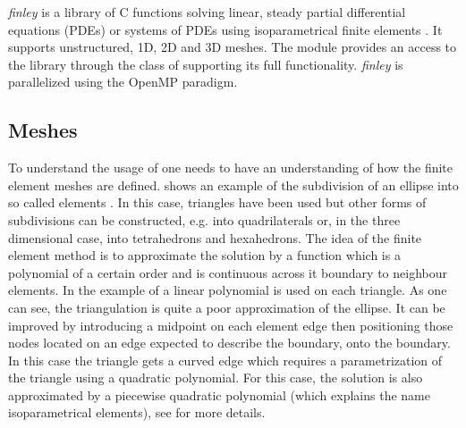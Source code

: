  

{\it finley} is a library of C functions solving linear, steady partial differential equations
 (PDEs) or systems of PDEs using isoparametrical finite 
elements .
It supports unstructured, 1D, 2D and 3D meshes. The module \finley provides an access to the
library through the \LinearPDE class of \escript supporting its full functionality. {\it finley} 
is parallelized using the OpenMP  paradigm. 

\subsection{Meshes}
To understand the usage of \finley one needs to have an understanding of how the finite element meshes
 are defined.  shows an example of the
subdivision of an ellipse into so called elements  . 
In this case, triangles have been used but other forms of subdivisions
can be constructed, e.g. into quadrilaterals or, in the three dimensional case, into tetrahedrons
and hexahedrons. The idea of the finite element method is to approximate the solution by a function
which is a polynomial of a certain order and is continuous across it boundary to neighbour elements.
In the example of  a linear polynomial is used on each triangle. As one can see, the triangulation
is quite a poor approximation of the ellipse. It can be improved by introducing a midpoint on each element edge then
positioning those nodes located on an edge expected to describe the boundary, onto the boundary.
In this case the triangle gets a curved edge which requires a parametrization of the triangle using a 
quadratic polynomial. For this case, the solution is also approximated by a piecewise quadratic polynomial
(which explains the name isoparametrical elements), see  for more details.   

